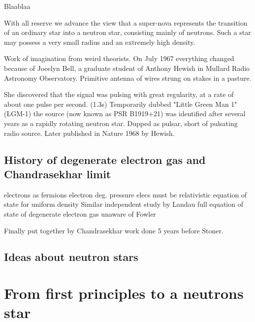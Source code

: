 Blaablaa\cite{Baade34a}
\begin{displayquote}
With all reserve we advance the view that a super-nova represents the transition of an ordinary star into a neutron star, consisting mainly of neutrons. Such a star may possess a very small radius and an extremely high density.
\end{displayquote}

Work of imagination from weird theorists.
On July 1967 everything changed because of Jocelyn Bell, a graduate student of Anthony Hewish in Mullard Radio Astronomy Observatory.
Primitive antenna of wires strung on stakes in a pasture.

She discovered that the signal was pulsing with great regularity, at a rate of about one pulse per second. (1.3s)
Temporarily dubbed "Little Green Man 1" (LGM-1) the source (now known as PSR B1919+21) was identified after several years as a rapidly rotating neutron star.
Dupped as pulsar, short of pulsating radio source.
Later published in Nature 1968 by Hewish. \cite{Hewish68}


\subsection{History of degenerate electron gas and Chandrasekhar limit}
electrons as fermions\cite{Dirac25}
electron deg. pressure \cite{Fowler26}
elecs must be relativistic \cite{Anderson29}
equation of state for uniform density \cite{Stoner30}
Similar independent study by Landau \cite{Landau32}
full equation of state of degenerate electron gas unaware of Fowler \cite{Frenkel28} \cite{Yakovlev94}

Finally put together by Chandrasekhar \cite{Cha31} work done 5 years before Stoner.

\subsection{Ideas about neutron stars}




\section{From first principles to a neutrons star}

